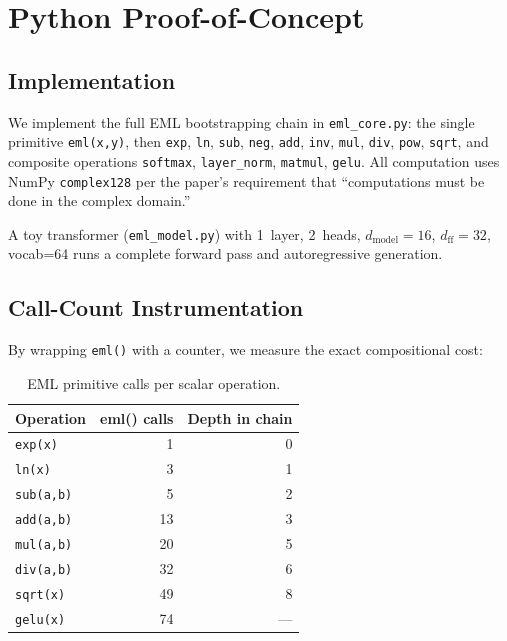 \documentclass[acmsmall,nonacm]{acmart}
\begin{document}
\section{Python Proof-of-Concept}
\label{sec:python}

\subsection{Implementation}

We implement the full EML bootstrapping chain in
\texttt{eml\_core.py}: the single primitive \texttt{eml(x,y)}, then
\texttt{exp}, \texttt{ln}, \texttt{sub}, \texttt{neg}, \texttt{add},
\texttt{inv}, \texttt{mul}, \texttt{div}, \texttt{pow}, \texttt{sqrt},
and composite operations \texttt{softmax}, \texttt{layer\_norm},
\texttt{matmul}, \texttt{gelu}.  All computation uses NumPy
\texttt{complex128} per the paper's requirement that ``computations must
be done in the complex domain.''

A toy transformer (\texttt{eml\_model.py}) with 1~layer, 2~heads,
$d_{\text{model}}=16$, $d_{\text{ff}}=32$, vocab=64 runs a complete
forward pass and autoregressive generation.

\subsection{Call-Count Instrumentation}

By wrapping \texttt{eml()} with a counter, we measure the exact
compositional cost:

\begin{table}[h]
\caption{EML primitive calls per scalar operation.}
\label{tab:scalar-depth}
\centering
\begin{tabular}{lrr}
\toprule
\textbf{Operation} & \textbf{eml() calls} & \textbf{Depth in chain} \\
\midrule
\texttt{exp(x)}    & 1  & 0 \\
\texttt{ln(x)}     & 3  & 1 \\
\texttt{sub(a,b)}  & 5  & 2 \\
\texttt{add(a,b)}  & 13 & 3 \\
\texttt{mul(a,b)}  & 20 & 5 \\
\texttt{div(a,b)}  & 32 & 6 \\
\texttt{sqrt(x)}   & 49 & 8 \\
\texttt{gelu(x)}   & 74 & --- \\
\bottomrule
\end{tabular}
\end{table}
\end{document}
